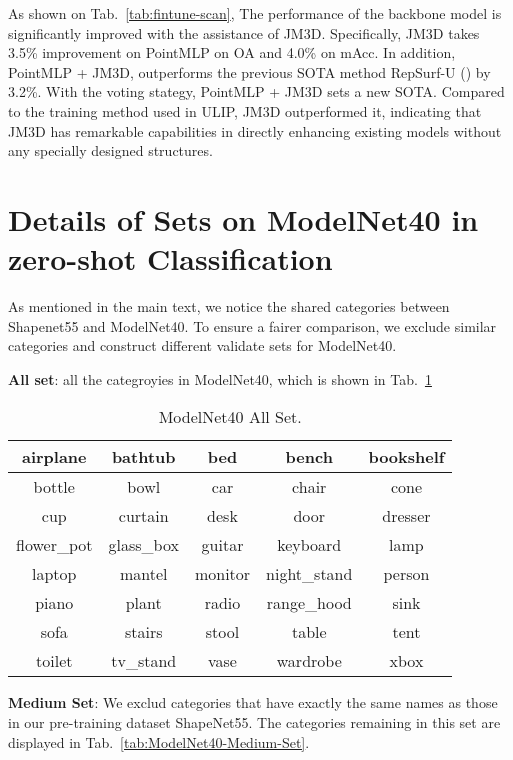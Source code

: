 \documentclass[sigconf]{acmart}
\begin{document}
As shown on Tab.~\ref{tab:fintune-scan}, The performance of the backbone model is significantly improved with the assistance of JM3D. Specifically, JM3D takes 3.5\% improvement on PointMLP on OA and 4.0\% on mAcc. In addition, PointMLP + JM3D, outperforms the previous SOTA method RepSurf-U () by 3.2\%. With the voting stategy, PointMLP + JM3D sets a new SOTA. Compared to the training method used in ULIP, JM3D outperformed it, indicating that JM3D has remarkable capabilities in directly enhancing existing models without any specially designed structures. 

\section{Details of Sets on ModelNet40 in zero-shot Classification}

As mentioned in the main text, we notice the shared categories between Shapenet55 and ModelNet40. To ensure a fairer comparison, we exclude similar categories and construct different validate sets for ModelNet40.

\noindent\textbf{All set}: all the categroyies in ModelNet40, which is shown in Tab.~\ref{tab:ModelNet40-All-Set}

\begin{table}[htb]
    \small
    \caption{ModelNet40 All Set.}
    \begin{tabular}{ccccc}
        \toprule
        airplane & bathtub & bed & bench & bookshelf \\
        \midrule
        bottle & bowl & car & chair & cone \\
        \midrule
        cup& curtain& desk& door& dresser \\
        \midrule
        flower\_pot& glass\_box& guitar& keyboard& lamp \\
        \midrule
        laptop& mantel& monitor& night\_stand& person \\
        \midrule
        piano& plant& radio& range\_hood& sink \\
        \midrule
        sofa& stairs& stool& table& tent \\
        \midrule
        toilet& tv\_stand& vase& wardrobe& xbox \\
        \bottomrule
    \end{tabular}
    \label{tab:ModelNet40-All-Set}
\end{table}

\noindent\textbf{Medium Set}: We exclud categories that have exactly the same names as those in our pre-training dataset ShapeNet55. The categories remaining in this set are displayed in Tab.~\ref{tab:ModelNet40-Medium-Set}.
\end{document}
